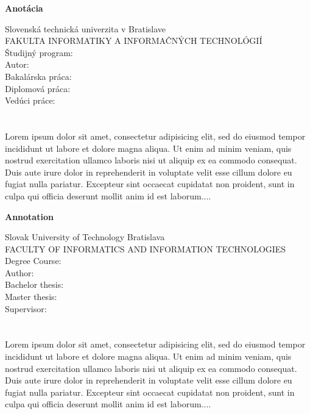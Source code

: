 \newpage
\thispagestyle{plain}
\begin{center}
\begin{Large}
\textbf{Anotácia} \\
\end{Large}
\end{center}
Slovenská technická univerzita v Bratislave \\
FAKULTA INFORMATIKY A INFORMAČNÝCH TECHNOLÓGIÍ \\
\noindent
Študijný program: \Program \\
\noindent
Autor: \Author \\
{
	{Bakalárska práca: }\Title \\
}
{
	{Diplomová práca: }\Title \\
}
Vedúci práce: \Supervisor \\
\Month \Year \\
\noindent
\\
Lorem ipsum dolor sit amet, consectetur adipisicing elit, sed do eiusmod tempor incididunt ut labore et dolore magna aliqua. Ut enim ad minim veniam, quis nostrud exercitation ullamco laboris nisi ut aliquip ex ea commodo consequat. Duis aute irure dolor in reprehenderit in voluptate velit esse cillum dolore eu fugiat nulla pariatur. Excepteur sint occaecat cupidatat non proident, sunt in culpa qui officia deserunt mollit anim id est laborum....
\newpage
\thispagestyle{plain}
\begin{center}
\begin{Large}
\textbf{Annotation} \\
\end{Large}
\end{center}
Slovak University of Technology Bratislava \\
FACULTY OF INFORMATICS AND INFORMATION TECHNOLOGIES \\
\noindent
Degree Course: \Program \\
\noindent
Author: \Author \\
{
	{Bachelor thesis: }\Title \\
}
{
	{Master thesis: }\Title \\
}
Supervisor: \Supervisor \\
\Month \Year \\
\noindent
\\
Lorem ipsum dolor sit amet, consectetur adipisicing elit, sed do eiusmod tempor incididunt ut labore et dolore magna aliqua. Ut enim ad minim veniam, quis nostrud exercitation ullamco laboris nisi ut aliquip ex ea commodo consequat. Duis aute irure dolor in reprehenderit in voluptate velit esse cillum dolore eu fugiat nulla pariatur. Excepteur sint occaecat cupidatat non proident, sunt in culpa qui officia deserunt mollit anim id est laborum....
